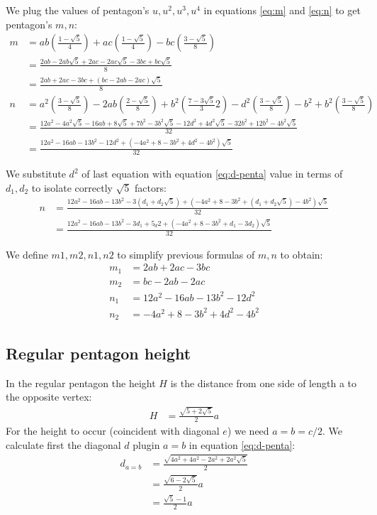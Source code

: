 \documentclass[11pt]{article}
\begin{document}
We plug the values of pentagon's $u,u^2,u^3,u^4$ in equations \ref{eq:m} and \ref{eq:n}
to get pentagon's $m,n$:
\begin{align}
m &= ab\left(\frac{1-\sqrt5}4\right)
 + ac\left(\frac{1-\sqrt5}4\right)
 - bc\left(\frac{3-\sqrt5}8\right)\nonumber\\
 &= \frac{2ab - 2ab\sqrt5 + 2ac - 2ac\sqrt5 - 3bc + bc\sqrt5}8\nonumber\\
 &= \frac{2ab + 2ac - 3bc + (bc -2ab - 2ac)\sqrt5}8\\
%
n &= a^2\left(\frac{3-\sqrt5}8\right)
 - 2ab\left(\frac{2-\sqrt5}8\right)
 + b^2\left(\frac{7-3\sqrt5}32\right)
 - d^2\left(\frac{3-\sqrt5}8\right)
 - b^2
 + b^2\left(\frac{3-\sqrt5}8\right)\nonumber\\
 &= \frac{
 12a^2 - 4a^2\sqrt5 -16ab+8\sqrt5 +7b^2-3b^2\sqrt5 -12d^2+4d^2\sqrt5 -32b^2
 +12b^2-4b^2\sqrt5
 }{32}\nonumber\\
 &= \frac{12a^2 - 16ab - 13b^2 - 12d^2 + (-4a^2 + 8 - 3b^2 + 4d^2 - 4b^2)\sqrt5}{32}
\end{align}

We substitute $d^2$ of last equation with equation \ref{eq:d-penta} value in terms of $d_1,d_2$
to isolate correctly $\sqrt5$ factors:
\begin{align}
n &= \frac{
 12a^2 - 16ab - 13b^2 - 3(d_1 + d_2\sqrt5)
 + (-4a^2 + 8 - 3b^2 + (d_1 + d_2\sqrt5) - 4b^2)\sqrt5
}{32} \nonumber\\
 &= \frac{
 12a^2 - 16ab - 13b^2 - 3d_1 + 5_d2
 + (-4a^2 + 8 - 3b^2 + d_1 - 3d_2)\sqrt5
 }{32}
\end{align}

We define $m1,m2,n1,n2$ to simplify previous formulas of $m,n$ to obtain:
\begin{align}
m_1 &= 2ab + 2ac - 3bc \\
m_2 &= bc -2ab - 2ac\\
n_1 &= 12a^2 - 16ab - 13b^2 - 12d^2\\
n_2 &= -4a^2 + 8 - 3b^2 + 4d^2 - 4b^2
\end{align}

\subsection{Regular pentagon height}

In the regular pentagon the height $H$ is the distance from one side of length a to the opposite vertex:
\begin{align}
H &= \frac{\sqrt{5+2\sqrt{5}}}{2}a
\end{align}
For the height to occur (coincident with diagonal $e$) we need $a = b = c/2$.
We calculate first the diagonal $d$ plugin $a=b$ in equation \ref{eq:d-penta}:
\begin{align}
d_{a=b} &= \frac{\sqrt{4a^2 + 4a^2 - 2a^2 + 2a^2\sqrt{5}}}{2}\nonumber\\
 &= \frac{\sqrt{6-2\sqrt{5}}}{2}a\nonumber\\
 &= \frac{\sqrt{5}-1}{2}a
\end{align}
\end{document}
